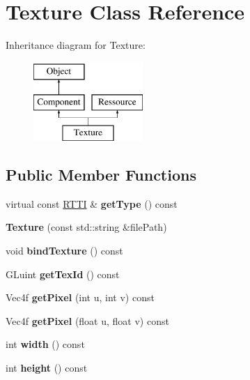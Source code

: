 \hypertarget{class_texture}{
\section{Texture Class Reference}
\label{class_texture}
}
Inheritance diagram for Texture:\begin{figure}[H]
\begin{center}
\leavevmode
\includegraphics[height=3.000000cm]{class_texture}
\end{center}
\end{figure}
\subsection*{Public Member Functions}
\begin{DoxyCompactItemize}
\item 
\hypertarget{class_texture_ad90cdf5df00d3bd3e2f8585156b390eb}{
virtual const \hyperlink{class_r_t_t_i}{RTTI} \& {\bfseries getType} () const }
\label{class_texture_ad90cdf5df00d3bd3e2f8585156b390eb}

\item 
\hypertarget{class_texture_a25ab3a58fa60ccafe3e3883727bc63fc}{
{\bfseries Texture} (const std::string \&filePath)}
\label{class_texture_a25ab3a58fa60ccafe3e3883727bc63fc}

\item 
\hypertarget{class_texture_ab3fd325003ae75f683e86b511e5872a7}{
void {\bfseries bindTexture} () const }
\label{class_texture_ab3fd325003ae75f683e86b511e5872a7}

\item 
\hypertarget{class_texture_af4209ac00bda33ab1638dfd88e7951a0}{
GLuint {\bfseries getTexId} () const }
\label{class_texture_af4209ac00bda33ab1638dfd88e7951a0}

\item 
\hypertarget{class_texture_a249deb0d8e3d0e152cc50931b9145f81}{
Vec4f {\bfseries getPixel} (int u, int v) const }
\label{class_texture_a249deb0d8e3d0e152cc50931b9145f81}

\item 
\hypertarget{class_texture_a1f3e2bb88d139a8a15a11f88a34962fb}{
Vec4f {\bfseries getPixel} (float u, float v) const }
\label{class_texture_a1f3e2bb88d139a8a15a11f88a34962fb}

\item 
\hypertarget{class_texture_a496e7ecce88213f6190dcb65659ee9b4}{
int {\bfseries width} () const }
\label{class_texture_a496e7ecce88213f6190dcb65659ee9b4}

\item 
\hypertarget{class_texture_a0a5592fcf3a2270578880aed20c4bde0}{
int {\bfseries height} () const }
\label{class_texture_a0a5592fcf3a2270578880aed20c4bde0}

\end{DoxyCompactItemize}
